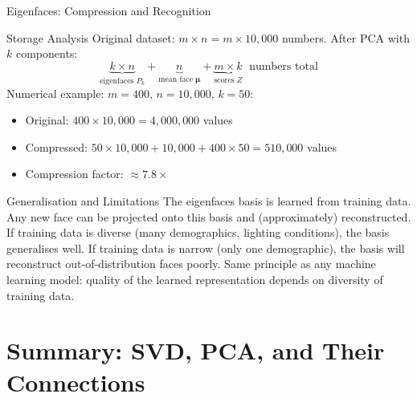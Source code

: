 \documentclass{beamer}
\begin{document}
\begin{frame}[shrink=10]{Eigenfaces: Compression and Recognition}
  \begin{block}{Storage Analysis}
    Original dataset: $m \times n = m \times 10{,}000$ numbers.
    After PCA with $k$ components:
    \[
      \underbrace{k \times n}_{\text{eigenfaces }P_k}
      + \underbrace{n}_{\text{mean face }\boldsymbol{\mu}}
      + \underbrace{m \times k}_{\text{scores }Z}
      \;\text{ numbers total}
    \]
    Numerical example: $m = 400$, $n = 10{,}000$, $k = 50$:
    \begin{itemize}\setlength\itemsep{3pt}
      \item Original: $400 \times 10{,}000 = 4{,}000{,}000$ values
      \item Compressed: $50 \times 10{,}000 + 10{,}000 + 400 \times 50
            = 510{,}000$ values
      \item Compression factor: $\approx 7.8\times$
    \end{itemize}
  \end{block}

  \begin{block}{Generalisation and Limitations}
    The eigenfaces basis is learned from training data.
    Any new face can be projected onto this basis and (approximately)
    reconstructed.
    If training data is diverse (many demographics, lighting conditions),
    the basis generalises well.
    If training data is narrow (only one demographic), the basis will
    reconstruct out-of-distribution faces poorly.
    Same principle as any machine learning model: quality of the learned
    representation depends on diversity of training data.
  \end{block}
\end{frame}

\section{Summary: SVD, PCA, and Their Connections}
\end{document}
